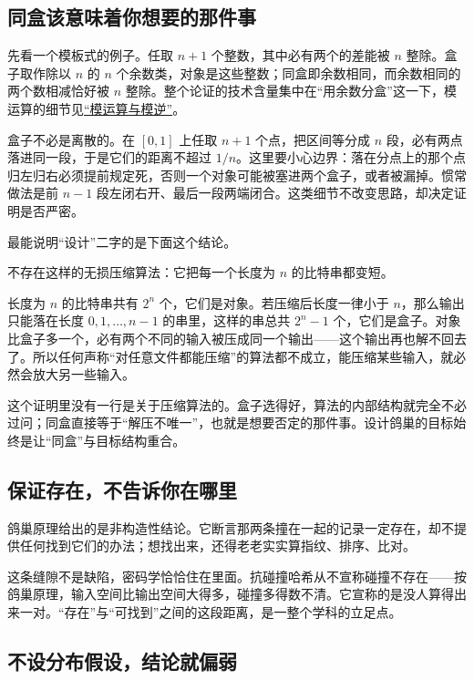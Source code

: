 \subsection{同盒该意味着你想要的那件事}

先看一个模板式的例子。任取 \(n+1\) 个整数，其中必有两个的差能被 \(n\) 整除。盒子取作除以 \(n\) 的 \(n\) 个余数类，对象是这些整数；同盒即余数相同，而余数相同的两个数相减恰好被 \(n\) 整除。整个论证的技术含量集中在``用余数分盒''这一下，模运算的细节见\hyperref[sec:04-Discrete-Mathematics/04-Number-Theory/02]{``模运算与模逆''}。

盒子不必是离散的。在 \([0,1]\) 上任取 \(n+1\) 个点，把区间等分成 \(n\) 段，必有两点落进同一段，于是它们的距离不超过 \(1/n\)。这里要小心边界：落在分点上的那个点归左归右必须提前规定死，否则一个对象可能被塞进两个盒子，或者被漏掉。惯常做法是前 \(n-1\) 段左闭右开、最后一段两端闭合。这类细节不改变思路，却决定证明是否严密。

最能说明``设计''二字的是下面这个结论。

\begin{proposition}
不存在这样的无损压缩算法：它把每一个长度为 \(n\) 的比特串都变短。
\end{proposition}

长度为 \(n\) 的比特串共有 \(2^n\) 个，它们是对象。若压缩后长度一律小于 \(n\)，那么输出只能落在长度 \(0,1,\dots,n-1\) 的串里，这样的串总共 \(2^n-1\) 个，它们是盒子。对象比盒子多一个，必有两个不同的输入被压成同一个输出——这个输出再也解不回去了。所以任何声称``对任意文件都能压缩''的算法都不成立，能压缩某些输入，就必然会放大另一些输入。

这个证明里没有一行是关于压缩算法的。盒子选得好，算法的内部结构就完全不必过问；同盒直接等于``解压不唯一''，也就是想要否定的那件事。设计鸽巢的目标始终是让``同盒''与目标结构重合。

\subsection{保证存在，不告诉你在哪里}

鸽巢原理给出的是非构造性结论。它断言那两条撞在一起的记录一定存在，却不提供任何找到它们的办法；想找出来，还得老老实实算指纹、排序、比对。

这条缝隙不是缺陷，密码学恰恰住在里面。抗碰撞哈希从不宣称碰撞不存在——按鸽巢原理，输入空间比输出空间大得多，碰撞多得数不清。它宣称的是没人算得出来一对。``存在''与``可找到''之间的这段距离，是一整个学科的立足点。

\subsection{不设分布假设，结论就偏弱}

